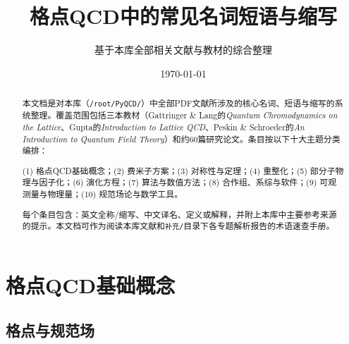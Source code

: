 \documentclass[12pt,a4paper]{ctexart}
\title{\heiti 格点QCD中的常见名词短语与缩写}
\author{基于本库全部相关文献与教材的综合整理}
\date{\today}
\begin{document}
\maketitle

\begin{abstract}
\noindent
本文档是对本库（\texttt{/root/PyQCD/}）中全部PDF文献所涉及的核心名词、短语与缩写的系统整理。覆盖范围包括三本教材（Gattringer \& Lang的\textit{Quantum Chromodynamics on the Lattice}、Gupta的\textit{Introduction to Lattice QCD}、Peskin \& Schroeder的\textit{An Introduction to Quantum Field Theory}）和约60篇研究论文。条目按以下十大主题分类编排：

(1) 格点QCD基础概念；(2) 费米子方案；(3) 对称性与定理；(4) 重整化；(5) 部分子物理与因子化；(6) 演化方程；(7) 算法与数值方法；(8) 合作组、系综与软件；(9) 可观测量与物理量；(10) 规范场论与数学工具。

每个条目包含：英文全称/缩写、中文译名、定义或解释，并附上本库中主要参考来源的提示。本文档可作为阅读本库文献和\texttt{补充/}目录下各专题解析报告的术语速查手册。
\end{abstract}

\tableofcontents
\newpage

\section{格点QCD基础概念}

\subsection*{格点与规范场}
\end{document}
